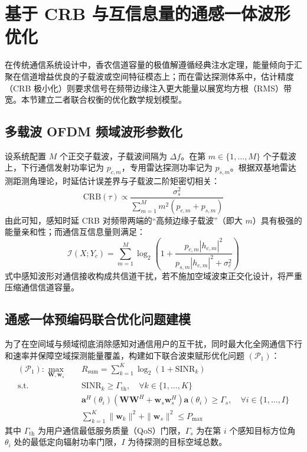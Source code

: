 \section{基于 CRB 与互信息量的通感一体波形优化}
\label{sec:waveform_design}

在传统通信系统设计中，香农信道容量的极值解遵循经典注水定理，能量倾向于汇聚在信道增益优良的子载波或空间特征模态上；而在雷达探测体系中，估计精度（CRB 极小化）则要求信号在频带边缘注入更大能量以展宽均方根（RMS）带宽。本节建立二者联合权衡的优化数学规划模型。

\subsection{多载波 OFDM 频域波形参数化}
设系统配置 $M$ 个正交子载波，子载波间隔为 $\Delta f$。在第 $m \in \{1, \dots, M\}$ 个子载波上，下行通信发射功率记为 $p_{c,m}$，专用雷达探测功率记为 $p_{s,m}$。根据双基地雷达测距测角理论，时延估计误差界与子载波二阶矩密切相关：
\begin{equation}
  \mathrm{CRB}(\tau) \propto \frac{\sigma_s^2}{\sum_{m=1}^M m^2 (p_{c,m} + p_{s,m})}
\end{equation}
由此可知，感知时延 CRB 对频带两端的“高频边缘子载波”（即大 $m$）具有极强的能量亲和性；而通信互信息量则满足：
\begin{equation}
  \mathcal{I}(X; Y_c) = \sum_{m=1}^M \log_2\left(1 + \frac{p_{c,m}|h_{c,m}|^2}{p_{s,m}|h_{c,m}|^2 + \sigma_c^2}\right)
\end{equation}
式中感知波形对通信接收构成共信道干扰，若不施加空域波束正交化设计，将严重压缩通信信道容量。

\subsection{通感一体预编码联合优化问题建模}
为了在空间域与频域彻底消除感知对通信用户的互干扰，同时最大化全网通信下行和速率并保障空域探测能量覆盖，构建如下联合波束赋形优化问题 $(\mathcal{P}_1)$：
\begin{align}
  (\mathcal{P}_1): \max_{\mathbf{W}, \mathbf{w}_s} \quad & R_{\mathrm{sum}} = \sum_{k=1}^K \log_2(1 + \mathrm{SINR}_k) \\
  \text{s.t.} \quad & \mathrm{SINR}_k \ge \Gamma_{\mathrm{th}}, \quad \forall k \in \{1, \dots, K\} \\
  & \mathbf{a}^H(\theta_i)(\mathbf{W}\mathbf{W}^H + \mathbf{w}_s \mathbf{w}_s^H)\mathbf{a}(\theta_i) \ge \Gamma_s, \quad \forall i \in \{1, \dots, I\} \\
  & \sum_{k=1}^K \|\mathbf{w}_k\|^2 + \|\mathbf{w}_s\|^2 \le P_{\max}
\end{align}
其中 $\Gamma_{\mathrm{th}}$ 为用户通信最低服务质量（QoS）门限，$\Gamma_s$ 为在第 $i$ 个感知目标方位角 $\theta_i$ 处的最低定向辐射功率门限，$I$ 为待探测的目标空域总数。


